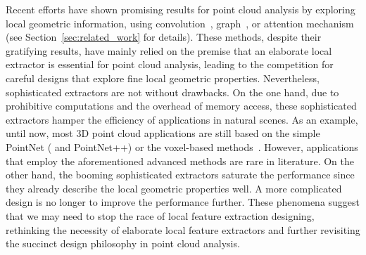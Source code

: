 \documentclass{article} \usepackage{iclr2022_conference,times}
\begin{document}
Recent efforts have shown promising results for point cloud analysis by exploring local geometric information, using convolution~\citep{li2021deepgcns}, graph~\citep{li2021deepgcns}, or attention mechanism~\citep{guo2021pct} (see Section~\ref{sec:related_work} for details).
These methods, despite their gratifying results, have mainly relied on the premise that an elaborate local extractor is essential for point cloud analysis, leading to the competition for careful designs that explore fine local geometric properties. Nevertheless, sophisticated extractors are not without drawbacks.
On the one hand, due to prohibitive computations and the overhead of memory access, these sophisticated extractors hamper the efficiency of applications in natural scenes. As an example, until now, most 3D point cloud applications are still based on the simple PointNet ( and PointNet++) or the voxel-based methods~\citep{liu2021group,li2021lidar, zhang2021self}. However, applications that employ the aforementioned advanced methods are rare in literature.
On the other hand, the booming sophisticated extractors saturate the performance since they already describe the local geometric properties well. A more complicated design is no longer to improve the performance further. 
These phenomena suggest that we may need to stop the race of local feature extraction designing, rethinking the necessity of elaborate local feature extractors and further revisiting the succinct design philosophy in point cloud analysis.
\end{document}
